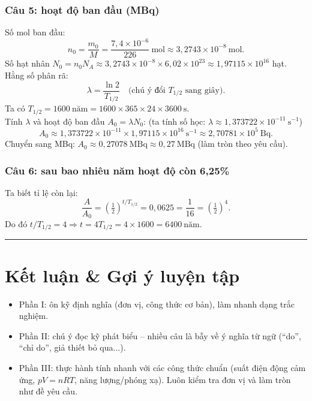 \documentclass[12pt,a4paper]{article}
\begin{document}
\subsubsection*{Câu 5: hoạt độ ban đầu (MBq)}
Số mol ban đầu:
\[
n_0=\frac{m_0}{M}=\frac{7{,}4\times10^{-6}}{226}\ \mathrm{mol}\approx 3{,}2743\times10^{-8}\ \mathrm{mol}.
\]
Số hạt nhân $N_0=n_0N_A\approx 3{,}2743\times10^{-8}\times 6{,}02\times10^{23}\approx 1{,}97115\times10^{16}$ hạt.
Hằng số phân rã:
\[
\lambda=\frac{\ln 2}{T_{1/2}} \quad\text{(chú ý đổi }T_{1/2}\text{ sang giây)}.
\]
Ta có $T_{1/2}=1600\ \text{năm}=1600\times 365\times 24\times 3600\ \text{s}$.\\
Tính $\lambda$ và hoạt độ ban đầu $A_0=\lambda N_0$:
(ta tính số học: $\lambda\approx 1{,}373722\times10^{-11}\ \mathrm{s^{-1}}$)
\[
A_0 \approx 1{,}373722\times10^{-11}\times 1{,}97115\times10^{16}\ \mathrm{s^{-1}}
\approx 2{,}70781\times10^5\ \mathrm{Bq}.
\]
Chuyển sang MBq: $A_0\approx 0{,}27078\ \mathrm{MBq}\approx 0{,}27\ \mathrm{MBq}$ (làm tròn theo yêu cầu).

\subsubsection*{Câu 6: sau bao nhiêu năm hoạt độ còn 6{,}25\%}
Ta biết tỉ lệ còn lại:
\[
\frac{A}{A_0}=\left(\tfrac12\right)^{t/T_{1/2}} = 0{,}0625 = \frac{1}{16} =\left(\tfrac12\right)^4.
\]
Do đó $t/T_{1/2}=4 \Rightarrow t=4T_{1/2}=4\times1600=6400\ \text{năm}$.

\hrule
\section*{Kết luận \& Gợi ý luyện tập}
\begin{itemize}
  \item Phần I: ôn kỹ định nghĩa (đơn vị, công thức cơ bản), làm nhanh dạng trắc nghiệm.
  \item Phần II: chú ý đọc kỹ phát biểu -- nhiều câu là bẫy về ý nghĩa từ ngữ (``do'', ``chỉ do'', giả thiết bỏ qua...).
  \item Phần III: thực hành tính nhanh với các công thức chuẩn (suất điện động cảm ứng, $pV=nRT$, năng lượng/phóng xạ). Luôn kiểm tra đơn vị và làm tròn như đề yêu cầu.
\end{itemize}
\end{document}
